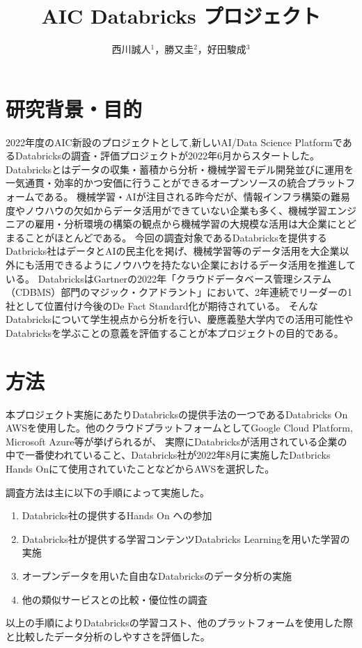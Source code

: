 \documentclass[twocolumn]{jsarticle}
\title{AIC Databricks プロジェクト}
\author{西川誠人$^1$，勝又圭$^2$，好田駿成$^3$}
\begin{document}
\maketitle
\section{研究背景・目的}
2022年度のAIC新設のプロジェクトとして,新しいAI/Data Science PlatformであるDatabricksの調査・評価プロジェクトが2022年6月からスタートした。
Databricksとはデータの収集・蓄積から分析・機械学習モデル開発並びに運用を一気通貫・効率的かつ安価に行うことができるオープンソースの統合プラットフォーム\cite{databricksHP}である。
機械学習・AIが注目される昨今だが、情報インフラ構築の難易度やノウハウの欠如からデータ活用ができていない企業も多く、機械学習エンジニアの雇用・分析環境の構築の観点から機械学習の大規模な活用は大企業にとどまることがほとんどである。
今回の調査対象であるDatabricksを提供するDatbricks社はデータとAIの民主化を掲げ、機械学習等のデータ活用を大企業以外にも活用できるようにノウハウを持たない企業におけるデータ活用を推進している。
DatabricksはGartnerの2022年「クラウドデータベース管理システム（CDBMS）部門のマジック・クアドラント」において、2年連続でリーダーの1社\cite{Gartner}として位置付け今後のDe Fact Standard化が期待されている。
そんなDatabricksについて学生視点から分析を行い、慶應義塾大学内での活用可能性やDatabricksを学ぶことの意義を評価することが本プロジェクトの目的である。
\section{方法}
本プロジェクト実施にあたりDatabricksの提供手法の一つであるDatabricks On AWSを使用した。他のクラウドプラットフォームとしてGoogle Cloud Platform, Microsoft Azure等が挙げられるが、
実際にDatabricksが活用されている企業の中で一番使われていること、Databricks社が2022年8月に実施したDatbricks Hands Onにて使用されていたことなどからAWSを選択した。\par 
調査方法は主に以下の手順によって実施した。
\begin{enumerate}
  \item Databricks社の提供するHands On への参加
  \item Databricks社が提供する学習コンテンツDatabricks Learningを用いた学習の実施
  \item オープンデータを用いた自由なDatabricksのデータ分析の実施
  \item 他の類似サービスとの比較・優位性の調査
\end{enumerate}
以上の手順によりDatabricksの学習コスト、他のプラットフォームを使用した際と比較したデータ分析のしやすさを評価した。
\end{document}
